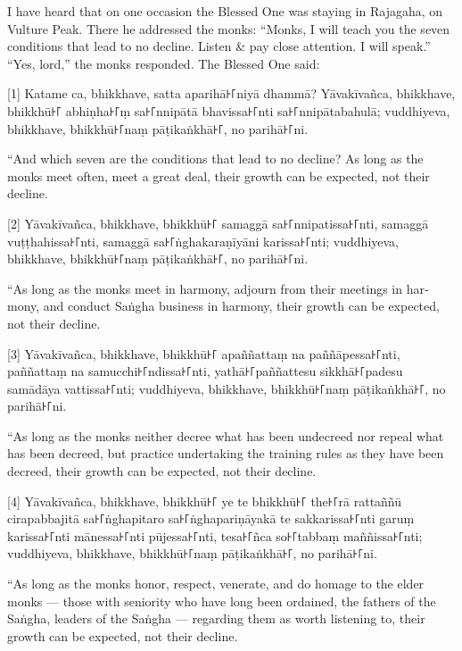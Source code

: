 \begin{english}
  I have heard that on one occasion the Blessed One was staying in Rajagaha, on
  Vulture Peak. There he addressed the monks: “Monks, I will teach you the seven
  conditions that lead to no decline. Listen \& pay close attention. I will
  speak.” “Yes, lord,” the monks responded. The Blessed One said:
\end{english}

[1] Katame ca, bhikkhave, satta aparihā꜔꜒niyā dhammā? Yāvakīvañca, bhikkhave, bhikkhū꜔꜒
abhiṇha꜔꜒ṃ sa꜔꜒nnipātā bhavissa꜔꜒nti sa꜔꜒nnipātabahulā; vuddhiyeva, bhikkhave,
bhikkhū꜔꜒naṃ pāṭikaṅkhā꜔꜒, no parihā꜔꜒ni.

\begin{english}
  “And which seven are the conditions that lead to no decline? As long as the
  monks meet often, meet a great deal, their growth can be expected, not their
  decline.
\end{english}

[2] Yāvakīvañca, bhikkhave, bhikkhū꜔꜒ samaggā sa꜔꜒nnipatissa꜔꜒nti, samaggā
vuṭṭhahissa꜔꜒nti, samaggā sa꜔꜒ṅghakaraṇīyāni karissa꜔꜒nti; vuddhiyeva, bhikkhave,
bhikkhū꜔꜒naṃ pāṭikaṅkhā꜔꜒, no parihā꜔꜒ni.

\begin{english}
  “As long as the monks meet in harmony, adjourn from their meetings in harmony,
  and conduct Saṅgha business in harmony, their growth can be expected, not
  their decline.
\end{english}

[3] Yāvakīvañca, bhikkhave, bhikkhū꜔꜒ apaññattaṃ na paññāpessa꜔꜒nti, paññattaṃ na
samucchi꜔꜒ndissa꜔꜒nti, yathā꜔꜒paññattesu sikkhā꜔꜒padesu samādāya vattissa꜔꜒nti;
vuddhiyeva, bhikkhave, bhikkhū꜔꜒naṃ pāṭikaṅkhā꜔꜒, no parihā꜔꜒ni.

\begin{english}
  “As long as the monks neither decree what has been undecreed nor repeal what
  has been decreed, but practice undertaking the training rules as they have
  been decreed, their growth can be expected, not their decline.
\end{english}

[4] Yāvakīvañca, bhikkhave, bhikkhū꜔꜒ ye te bhikkhū꜔꜒ the꜔꜒rā rattaññū cirapabbajitā
sa꜔꜒ṅghapitaro sa꜔꜒ṅghapariṇāyakā te sakkarissa꜔꜒nti garuṃ karissa꜔꜒nti mānessa꜔꜒nti
pūjessa꜔꜒nti, tesa꜔꜒ñca so꜔꜒tabbaṃ maññissa꜔꜒nti; vuddhiyeva, bhikkhave, bhikkhū꜔꜒naṃ
pāṭikaṅkhā꜔꜒, no parihā꜔꜒ni.

\begin{english}
  “As long as the monks honor, respect, venerate, and do homage to the elder
  monks — those with seniority who have long been ordained, the fathers of the
  Saṅgha, leaders of the Saṅgha — regarding them as worth listening to, their
  growth can be expected, not their decline.
\end{english}

